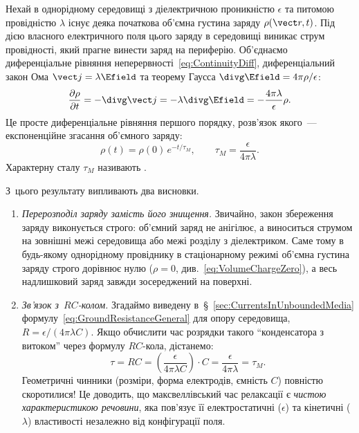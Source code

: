 Нехай в однорідному середовищі з діелектричною проникністю $\epsilon$ та питомою провідністю $\lambda$ існує деяка початкова об'ємна густина заряду $\rho(\vect r, t)$. Під дією власного електричного поля цього заряду в середовищі виникає струм провідності, який прагне винести заряд на периферію. Об'єднаємо диференціальне рівняння неперервності~\eqref{eq:ContinuityDiff}, диференціальний закон Ома $\vect j = \lambda\Efield$ та теорему Гаусса $\divg\Efield = 4\pi\rho/\epsilon$:
\begin{equation*}
    \frac{\partial\rho}{\partial t} = -\divg\vect j = -\lambda\divg\Efield = -\frac{4\pi\lambda}{\epsilon}\rho.
\end{equation*}
Це просте диференціальне рівняння першого порядку, розв'язок якого~--- експоненційне згасання об'ємного заряду:
\begin{equation}\label{eq:MaxwellRelaxation}
    \rho(t) = \rho(0)\,e^{-t/\tau_M}, \qquad \tau_M = \frac{\epsilon}{4\pi\lambda}.
\end{equation}
Характерну сталу $\tau_M$ називають .

З~цього результату випливають два висновки.

\begin{enumerate}
    \item \emph{Перерозподіл заряду замість його знищення.} Звичайно, закон збереження заряду виконується строго: об'ємний заряд не анігілює, а виноситься струмом на зовнішні межі середовища або межі розділу з діелектриком. Саме тому в будь-якому однорідному провіднику в стаціонарному режимі об'ємна густина заряду строго дорівнює нулю ($\rho = 0$, див.~\eqref{eq:VolumeChargeZero}), а весь надлишковий заряд завжди зосереджений на поверхні.
    
    \item \emph{Зв'язок з~$RC$-колом.} Згадаймо виведену в~\S~\ref{sec:CurrentsInUnboundedMedia} формулу~\eqref{eq:GroundResistanceGeneral} для опору середовища, $R = \epsilon / (4\pi\lambda C)$. Якщо обчислити час розрядки такого \enquote{конденсатора з витоком} через формулу $RC$-кола, дістанемо:
    \begin{equation*}
        \tau = R C = \left(\frac{\epsilon}{4\pi\lambda C}\right) \cdot C = \frac{\epsilon}{4\pi\lambda} = \tau_M.
    \end{equation*}
    Геометричні чинники (розміри, форма електродів, ємність $C$) повністю скоротилися! Це доводить, що максвеллівський час релаксації є \emph{чистою характеристикою речовини}, яка пов'язує її електростатичні ($\epsilon$) та кінетичні ($\lambda$) властивості незалежно від конфігурації поля.
\end{enumerate}

